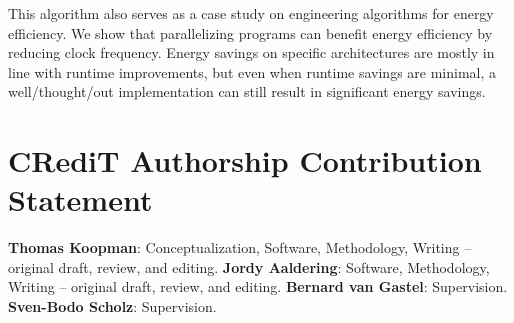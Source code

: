 \documentclass[11pt,a4paper]{article}
\begin{document}
This algorithm also serves as a case study on engineering algorithms for energy efficiency.
We show that parallelizing programs can benefit energy efficiency by reducing clock frequency.
Energy savings on specific architectures are mostly in line with runtime improvements, but even when runtime savings are minimal, a well\-/thought\-/out implementation can still result in significant energy savings.

\section*{CRediT Authorship Contribution Statement}
\textbf{Thomas Koopman}: Conceptualization, Software, Methodology, Writing -- original draft, review, and editing.
\textbf{Jordy Aaldering}: Software, Methodology, Writing -- original draft, review, and editing.
\textbf{Bernard van Gastel}: Supervision.
\textbf{Sven-Bodo Scholz}: Supervision.

\printbibliography
\end{document}
